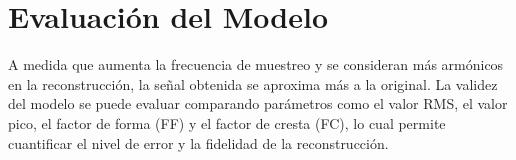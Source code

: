 \documentclass[conference]{IEEEtran}
\theoremstyle{mytheoremstyle}
\theoremstyle{mytheoremstyle}
\theoremstyle{myproblemstyle}
\begin{document}
        \section{Evaluación del Modelo}
        A medida que aumenta la frecuencia de muestreo y se consideran más armónicos en la reconstrucción, la señal obtenida se aproxima más a la original. La validez del modelo se puede evaluar comparando parámetros como el valor RMS, el valor pico, el factor de forma (FF) y el factor de cresta (FC), lo cual permite cuantificar el nivel de error y la fidelidad de la reconstrucción.
        
        
\end{document}
